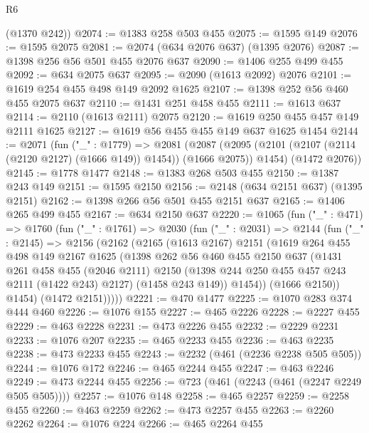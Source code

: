 \begin{lexlean}{R6}
\begin{coremodule}
      (@1370 @242))
@2074 := @1383 @258 @503 @455
@2075 := @1595 @149
@2076 := @1595 @2075
@2081 := @2074 (@634 @2076 @637) (@1395 @2076)
@2087 := @1398 @256 @56 @501 @455 @2076 @637
@2090 := @1406 @255 @499 @455
@2092 := @634 @2075 @637
@2095 := @2090 (@1613 @2092) @2076
@2101 := @1619 @254 @455 @498 @149 @2092 @1625
@2107 := @1398 @252 @56 @460 @455 @2075 @637
@2110 := @1431 @251 @458 @455
@2111 := @1613 @637
@2114 := @2110 (@1613 @2111) @2075
@2120 := @1619 @250 @455 @457 @149 @2111 @1625
@2127 := @1619 @56 @455 @455 @149 @637 @1625 @1454
@2144 := @2071
    (fun ("_" : @1779) =>
    @2081
      (@2087 (@2095 (@2101 (@2107 (@2114 (@2120 @2127) (@1666 @149)) @1454)) (@1666 @2075)) @1454)
      (@1472 @2076))
@2145 := @1778 @1477
@2148 := @1383 @268 @503 @455
@2150 := @1387 @243 @149
@2151 := @1595 @2150
@2156 := @2148 (@634 @2151 @637) (@1395 @2151)
@2162 := @1398 @266 @56 @501 @455 @2151 @637
@2165 := @1406 @265 @499 @455
@2167 := @634 @2150 @637
@2220 := @1065
    (fun ("_" : @471) =>
    @1760
      (fun ("_" : @1761) =>
      @2030
        (fun ("_" : @2031) =>
        @2144
          (fun ("_" : @2145) =>
          @2156
            (@2162
              (@2165
                (@1613 @2167)
                @2151
                (@1619
                  @264
                  @455
                  @498
                  @149
                  @2167
                  @1625
                  (@1398
                    @262
                    @56
                    @460
                    @455
                    @2150
                    @637
                    (@1431
                      @261
                      @458
                      @455
                      (@2046 @2111)
                      @2150
                      (@1398 @244 @250 @455 @457 @243 @2111 (@1422 @243) @2127)
                      (@1458 @243 @149))
                    @1454))
                (@1666 @2150))
              @1454)
            (@1472 @2151)))))
@2221 := @470 @1477
@2225 := @1070 @283 @374 @444 @460
@2226 := @1076 @155
@2227 := @465 @2226
@2228 := @2227 @455
@2229 := @463 @2228
@2231 := @473 @2226 @455
@2232 := @2229 @2231
@2233 := @1076 @207
@2235 := @465 @2233 @455
@2236 := @463 @2235
@2238 := @473 @2233 @455
@2243 := @2232 (@461 (@2236 @2238 @505 @505))
@2244 := @1076 @172
@2246 := @465 @2244 @455
@2247 := @463 @2246
@2249 := @473 @2244 @455
@2256 := @723 (@461 (@2243 (@461 (@2247 @2249 @505 @505))))
@2257 := @1076 @148
@2258 := @465 @2257
@2259 := @2258 @455
@2260 := @463 @2259
@2262 := @473 @2257 @455
@2263 := @2260 @2262
@2264 := @1076 @224
@2266 := @465 @2264 @455

\end{coremodule}
\end{lexlean}

